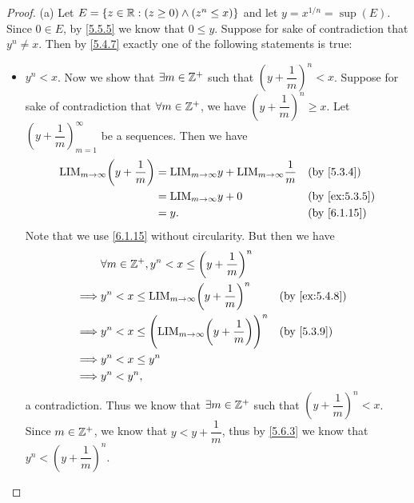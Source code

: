 \begin{proof}{(a)}
  Let \(E = \{z \in \mathbb{R} : (z \geq 0) \land (z^n \leq x)\}\) and let \(y = x^{1 / n} = \sup(E)\).
  Since \(0 \in E\), by \cref{5.5.5} we know that \(0 \leq y\).
  Suppose for sake of contradiction that \(y^n \neq x\).
  Then by \cref{5.4.7} exactly one of the following statements is true:
  \begin{itemize}
    \item \(y^n < x\).
          Now we show that \(\exists m \in \mathbb{Z}^+\) such that \((y + \dfrac{1}{m})^n < x\).
          Suppose for sake of contradiction that \(\forall m \in \mathbb{Z}^+\), we have \((y + \dfrac{1}{m})^n \geq x\).
          Let \((y + \dfrac{1}{m})_{m = 1}^\infty\) be a sequences.
          Then we have
          \begin{align*}
            \text{LIM}_{m \to \infty} \bigg(y + \dfrac{1}{m}\bigg) & = \text{LIM}_{m \to \infty} y + \text{LIM}_{m \to \infty} \dfrac{1}{m} &  & \by{5.3.4}    \\
                                                                   & = \text{LIM}_{m \to \infty} y + 0                                      &  & \by{ex:5.3.5} \\
                                                                   & = y.                                                                   &  & \by{6.1.15}
          \end{align*}
          Note that we use \cref{6.1.15} without circularity.
          But then we have
          \begin{align*}
                     & \forall m \in \Z^+, y^n < x \leq \bigg(y + \dfrac{1}{m}\bigg)^n                                      \\
            \implies & y^n < x \leq \text{LIM}_{m \to \infty} \bigg(y + \dfrac{1}{m}\bigg)^n             &  & \by{ex:5.4.8} \\
            \implies & y^n < x \leq \Bigg(\text{LIM}_{m \to \infty} \bigg(y + \dfrac{1}{m}\bigg)\Bigg)^n &  & \by{5.3.9}    \\
            \implies & y^n < x \leq y^n                                                                                     \\
            \implies & y^n < y^n,
          \end{align*}
          a contradiction.
          Thus we know that \(\exists m \in \mathbb{Z}^+\) such that \((y + \dfrac{1}{m})^n < x\).
          Since \(m \in \mathbb{Z}^+\), we know that \(y < y + \dfrac{1}{m}\), thus by \cref{5.6.3} we know that \(y^n < (y + \dfrac{1}{m})^n\).

\end{itemize}
\end{proof}
